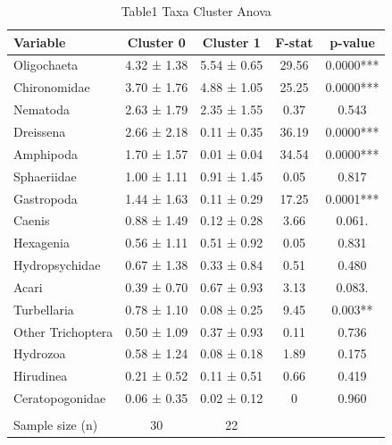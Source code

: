 
\begin{table}[htbp]
    \centering
    \small
    \caption{Table1 Taxa Cluster Anova}
    \label{tab:table1_taxa_cluster_anova}
    \begin{tabular}{lcccc}
        \toprule
        Variable & Cluster 0 & Cluster 1 & F-stat & p-value \\
        \midrule
        Oligochaeta & 4.32 ± 1.38 & 5.54 ± 0.65 & 29.56 & 0.0000*** \\
        Chironomidae & 3.70 ± 1.76 & 4.88 ± 1.05 & 25.25 & 0.0000*** \\
        Nematoda & 2.63 ± 1.79 & 2.35 ± 1.55 & 0.37 & 0.543 \\
        Dreissena & 2.66 ± 2.18 & 0.11 ± 0.35 & 36.19 & 0.0000*** \\
        Amphipoda & 1.70 ± 1.57 & 0.01 ± 0.04 & 34.54 & 0.0000*** \\
        Sphaeriidae & 1.00 ± 1.11 & 0.91 ± 1.45 & 0.05 & 0.817 \\
        Gastropoda & 1.44 ± 1.63 & 0.11 ± 0.29 & 17.25 & 0.0001*** \\
        Caenis & 0.88 ± 1.49 & 0.12 ± 0.28 & 3.66 & 0.061. \\
        Hexagenia & 0.56 ± 1.11 & 0.51 ± 0.92 & 0.05 & 0.831 \\
        Hydropsychidae & 0.67 ± 1.38 & 0.33 ± 0.84 & 0.51 & 0.480 \\
        Acari & 0.39 ± 0.70 & 0.67 ± 0.93 & 3.13 & 0.083. \\
        Turbellaria & 0.78 ± 1.10 & 0.08 ± 0.25 & 9.45 & 0.003** \\
        Other Trichoptera & 0.50 ± 1.09 & 0.37 ± 0.93 & 0.11 & 0.736 \\
        Hydrozoa & 0.58 ± 1.24 & 0.08 ± 0.18 & 1.89 & 0.175 \\
        Hirudinea & 0.21 ± 0.52 & 0.11 ± 0.51 & 0.66 & 0.419 \\
        Ceratopogonidae & 0.06 ± 0.35 & 0.02 ± 0.12 & 0 & 0.960 \\
         &  &  &  &  \\
        Sample size (n) & 30 & 22 &  &  \\
        \bottomrule
    \end{tabular}
\end{table}
